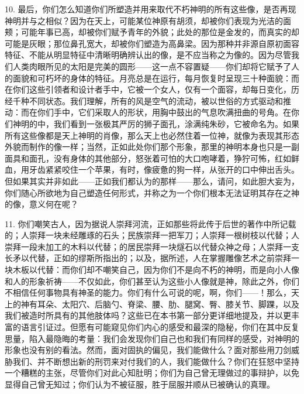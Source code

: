 10. 最后，你们怎么知道你们所塑造并用来取代不朽神明的所有这些像，是否再现神明并与之相似？因为在天上，可能某位神原有胡须，却被你们表现为光洁的面颊；可能年事已高，却被你们赋予青年的外貌；此处的那位是金发的，而真实的却可能是灰眼；那位鼻孔宽大，却被你们塑造为高鼻梁。因为那种并非源自原初面容特征、不能从明显特征中清晰明确辨认出的像，是不应当称之为像的。因为尽管我们人类肉眼所见的太阳是完美的圆形——这一点不容置疑——你们却将它赋予了人的面貌和可朽坏的身体的特征。月亮总是在运行，每月恢复时呈现三十种面貌：而在你们这些引领者和设计者手中，它被一个女人，仅有一个面容，却每日变化，历经千种不同状态。我们理解，所有的风是空气的流动，被以世俗的方式驱动和推动：而在你们手中，它们采取人的形状，用胸中鼓出的气息吹满扭曲的号角。在你们神明的中，我们看到一张极其严厉的狮子面孔，涂满纯朱砂，它被命名为。如果所有这些像都是天上神明的肖像，那么天上也必然住着一位神，就像为表现其形态外貌而制作的像一样；当然，正如此处你们那个形象，那里的神明本身也只是一副面具和面孔，没有身体的其他部分，怒张着可怕的大口咆哮着，狰狞可怖，红如鲜血，用牙齿紧紧咬住一个苹果，有时，像疲惫的狗一样，从张开的口中伸出舌头。但如果其实并非如此——正如我们都认为的那样——那么，请问，如此胆大妄为，你们随心所欲地为自己塑造任何形式，并称之为一个你们根本无法证明其存在之神的像，意义何在呢？\par

11. 你们嘲笑古人，因为据说人崇拜河流，正如那些将此传于后世的著作中所记载的；人崇拜一块未经雕琢的石头；民族崇拜一把军刀；人崇拜一根树枝以代替；人崇拜一段未加工的木料以代替；的居民崇拜一块燧石以代替众神之母；人崇拜一支长矛以代替，正如的缪斯所指出的；以及，据所述，人在掌握雕像艺术之前崇拜一块木板以代替：而你们却不嘲笑自己，因为你们不是向不朽的神明，而是向小人像和人的形象祈祷——不仅如此，你们甚至认为这些小人像就是神，除此之外，你们不相信任何事物具有神圣的能力。你们有什么可说的呢，啊，你们——！那么，天上的神有耳朵、太阳穴、后脑勺、脊梁、腰、肋、腿窝、臀、膝关节、脚踝，以及我们被造时所具有的其他肢体吗？这些已在本书第一部分更详细地提及，并以更丰富的语言引证过。但愿有可能窥见你们内心的感受和最深的隐秘，你们在其中反复思量，陷入最隐晦的考量：我们会发现你们自己也和我们有同样的感受，对神明的形象也没有别的看法。然而，面对固执的偏见，我们能做什么？面对那些用刀剑威胁我们、并不断想出新的刑罚来对付我们的人，我们能做什么？你们在狂怒中坚持一个糟糕的主张，尽管你们对此心知肚明；你们为自己曾无理做过的事辩护，以免显得自己曾无知过；你们认为不被征服，胜于屈服并顺从已被确认的真理。\par

